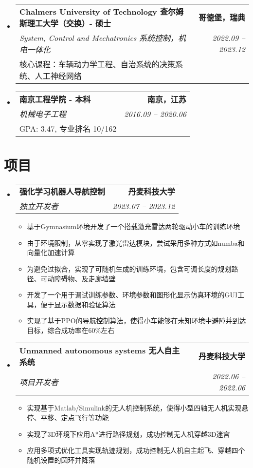 \documentclass[letterpaper,11pt]{article}
\makeatletter
\newcommand{\resumeItem}[1]{
  \item\small{
    {#1 \vspace{-2pt}}
  }
}
\newcommand{\resumeSubheading}[4]{
  \vspace{-2pt}\item\small{
    \begin{tabular*}{0.97\textwidth}[t]{l@{\extracolsep{\fill}}r}
      \textbf{#1} & \textbf{#2} \\
      \textit{#3} & \textit{#4} \\
    \end{tabular*}\vspace{-7pt}
  }
}
\newcommand{\resumeSubheadingExtended}[5]{  
  \item\small{
    \begin{tabular*}{0.97\textwidth}{@{\extracolsep{\fill}}lr}
      \textbf{#1} & \textbf{#2} \\  %
      \textit{#3} & \textit{#4} \\  %
      #5 &  %
    \end{tabular*}\vspace{-10pt}
  }
}
\newcommand{\resumeSubHeadingListStart}{\begin{itemize}[leftmargin=0.15in, label={}]}
\newcommand{\resumeSubHeadingListEnd}{\end{itemize}}
\newcommand{\resumeItemListStart}{\begin{itemize}}
\newcommand{\resumeItemListEnd}{\end{itemize}\vspace{-5pt}}
\makeatother
\begin{document}
  \vspace{-1mm} %

  \resumeSubHeadingListStart
    \resumeSubheadingExtended
      {Chalmers University of Technology 查尔姆斯理工大学（交换）- 硕士}{哥德堡，瑞典}
      {System, Control and Mechatronics 系统控制，机电一体化}{2022.09 -- 2023.12}
      {核心课程：车辆动力学工程、自治系统的决策系统、人工神经网络}
  \resumeSubHeadingListEnd
  
  \vspace{-1mm} %

  \resumeSubHeadingListStart
    \resumeSubheadingExtended
      {南京工程学院 - 本科}{南京，江苏}
      {机械电子工程}{2016.09 -- 2020.06}
      {GPA: 3.47, 专业排名 10/162}
  \resumeSubHeadingListEnd

\section{项目}
  \resumeSubHeadingListStart

    \resumeSubheading
      {\textbf{强化学习机器人导航控制 \; \href{https://1drv.ms/v/s!Al-YZOpjHxorgslaTIu4oeTj8TYROw?e=EflSJj}{\faVideoCamera} \;  \href{https://github.com/SpartanTan/RLATR}{\faGithub}}}{丹麦科技大学}
      {独立开发者}{2023.07 -- 2023.12}
      \resumeItemListStart
        \resumeItem{基于Gymnasium环境开发了一个搭载激光雷达两轮驱动小车的训练环境}
        \resumeItem{由于环境限制，从零实现了激光雷达模块，尝试采用多种方式如numba和向量化加速计算}
        \resumeItem{为避免过拟合，实现了可随机生成的训练环境，包含可调长度的规划路径、可动障碍物、及走廊墙壁}
        \resumeItem{开发了一个用于调试训练参数、环境参数和图形化显示仿真环境的GUI工具，便于显示数据和验证算法}
        \resumeItem{实现了基于PPO的导航控制算法，使得小车能够在未知环境中避障并到达目标，综合成功率在60\%左右}
    \resumeItemListEnd
      
    \resumeSubheading
      {\textbf{Unmanned autonomous systems 无人自主系统  \; \href{https://1drv.ms/v/s!Al-YZOpjHxorgslZm5SJR7mVF_eoPw?e=4kRkvd}{\faVideoCamera} \;  \href{https://github.com/SpartanTan/31390-UAS-2022}{\faGithub}}}{丹麦科技大学}
      {项目开发者}{2022.06 -- 2022.06}
      \resumeItemListStart
        \resumeItem{实现基于Matlab/Simulink的无人机控制系统，使得小型四轴无人机实现悬停、平移、定点飞行等功能}
        \resumeItem{实现了3D环境下应用A*进行路径规划，成功控制无人机穿越3D迷宫}
        \resumeItem{应用多项式优化工具实现轨迹规划，成功控制无人机自主起飞、穿越四个随机设置的圆环并降落}
      \resumeItemListEnd
  \resumeSubHeadingListEnd
\end{document}
